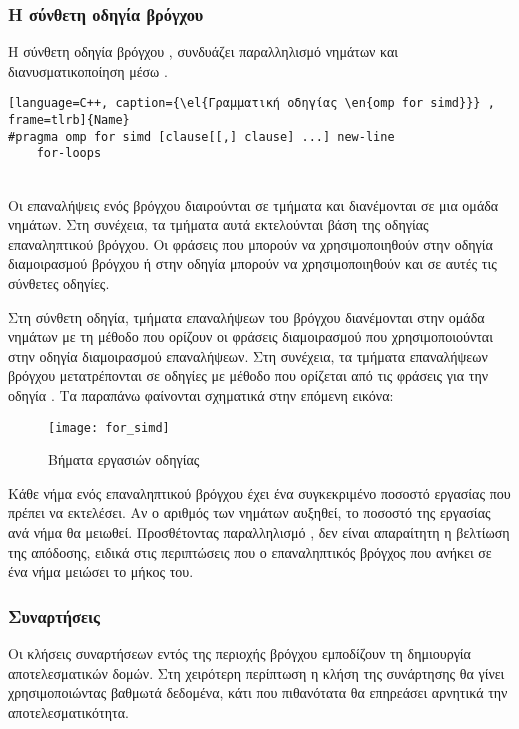 \subsubsection{Η σύνθετη οδηγία βρόγχου \emph{}}
Η σύνθετη οδηγία βρόγχου \emph{}, συνδυάζει παραλληλισμό νημάτων και διανυσματικοποίηση μέσω \emph{}.

\begin{spacing}{1.1}
\begin{lstlisting}[language=C++, caption={\el{Γραμματική οδηγίας \en{omp for simd}}} , frame=tlrb]{Name}
#pragma omp for simd [clause[[,] clause] ...] new-line
	for-loops
\end{lstlisting}
\end{spacing}
\ \\
Οι επαναλήψεις ενός βρόγχου διαιρούνται σε τμήματα και διανέμονται σε μια ομάδα νημάτων. Στη συνέχεια, τα τμήματα αυτά
εκτελούνται βάση της οδηγίας επαναληπτικού \emph{} βρόγχου. Οι φράσεις που μπορούν να χρησιμοποιηθούν στην
οδηγία διαμοιρασμού βρόγχου ή στην οδηγία \emph{} μπορούν να χρησιμοποιηθούν και σε αυτές τις σύνθετες οδηγίες.

Στη σύνθετη οδηγία, τμήματα επαναλήψεων του βρόγχου διανέμονται στην ομάδα νημάτων με τη μέθοδο που ορίζουν οι φράσεις
διαμοιρασμού που χρησιμοποιούνται στην οδηγία διαμοιρασμού επαναλήψεων. Στη συνέχεια, τα τμήματα επαναλήψεων βρόγχου
μετατρέπονται σε οδηγίες \emph{} με μέθοδο που ορίζεται από τις φράσεις για την οδηγία \emph{}. Τα
παραπάνω φαίνονται σχηματικά στην επόμενη εικόνα:
\ \\
\begin{figure}[h]
\texttt{[image: for\_simd]}
\centering
\captionsetup{justification=centering, singlelinecheck=false}
	\caption{ Βήματα εργασιών οδηγίας \emph{}}
\label{fig:for_simd}
\end{figure}

Κάθε νήμα ενός επαναληπτικού βρόγχου έχει ένα συγκεκριμένο ποσοστό εργασίας που πρέπει να εκτελέσει. Αν ο αριθμός των
νημάτων αυξηθεί, το ποσοστό της εργασίας ανά νήμα θα μειωθεί. Προσθέτοντας παραλληλισμό \emph{}, δεν είναι
απαραίτητη η βελτίωση της απόδοσης, ειδικά στις περιπτώσεις που ο επαναληπτικός \emph{} βρόγχος που ανήκει σε
ένα νήμα μειώσει το μήκος του.
\clearpage{}

\subsubsection{Συναρτήσεις \emph{}}
Οι κλήσεις συναρτήσεων εντός της περιοχής βρόγχου \emph{} εμποδίζουν τη δημιουργία αποτελεσματικών
\emph{} δομών. Στη χειρότερη περίπτωση η κλήση της συνάρτησης θα γίνει χρησιμοποιώντας βαθμωτά δεδομένα, κάτι
που πιθανότατα θα επηρεάσει αρνητικά την αποτελεσματικότητα.

